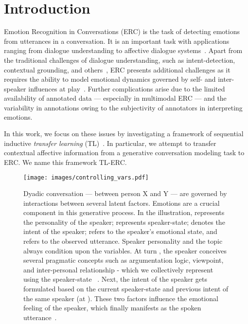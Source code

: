 \documentclass[preprint,3pt]{elsarticle}
\begin{document}
\section{Introduction} \label{sec:intro}

Emotion Recognition in Conversations (ERC) is the task of detecting emotions from utterances in a conversation. It is an important task with applications ranging from dialogue understanding to affective dialogue systems~\cite{poria2019emotion}. Apart from the traditional challenges of dialogue understanding, such as intent-detection, contextual grounding, and others~\cite{chen2017survey}, ERC presents additional challenges as it requires the ability to model emotional dynamics governed by self- and inter-speaker influences at play~\cite{DBLP:conf/naacl/HazarikaPZCMZ18}. Further complications arise due to the limited availability of annotated data --- especially in multimodal ERC --- and the variability in annotations owing to the subjectivity of annotators in interpreting emotions. 


In this work, we focus on these issues by investigating a framework of sequential inductive \textit{transfer learning} (TL)~\cite{pan2010survey}. In particular, we attempt to transfer contextual affective information from a generative conversation modeling task to ERC. We name this framework TL-ERC.

\begin{figure}[h]
	\centering
	\texttt{[image: images/controlling\_vars.pdf]}
	\caption{\footnotesize{Dyadic conversation --- between person X and Y --- are governed by interactions between several latent factors. Emotions are a crucial component in this generative process. In the illustration,  represents the personality of the speaker;  represents speaker-state;  denotes the intent of the speaker;  refers to the speaker's emotional state, and  refers to the observed utterance. Speaker personality and the topic always condition upon the variables. At turn , the speaker conceives several pragmatic concepts such as argumentation logic, viewpoint, and inter-personal relationship - which we collectively represent using the speaker-state ~\cite{hovy1987generating}. Next, the intent  of the speaker gets formulated based on the current speaker-state and previous intent of the same speaker (at ). These two factors influence the emotional feeling of the speaker, which finally manifests as the spoken utterance~\cite{poria2019emotion}. }}
	\label{fig:controlling_vars}
\end{figure}
\end{document}
